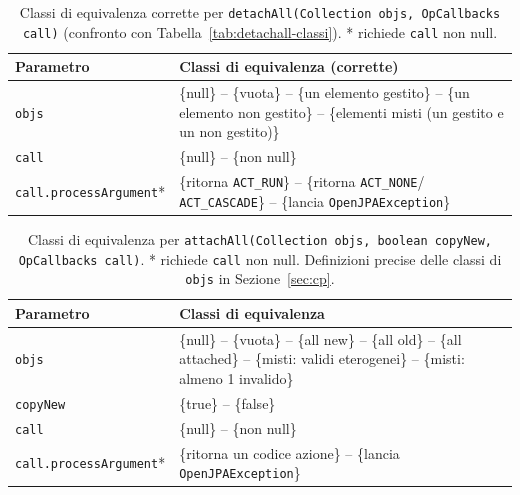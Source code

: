 \begin{table}[H]
\centering
\begin{tabularx}{\textwidth}{>{\raggedright\arraybackslash}p{} >{\raggedright\arraybackslash}X}
\toprule
Parametro & Classi di equivalenza (corrette) \\
\midrule
\texttt{objs} & \{null\} -- \{vuota\} -- \{un elemento gestito\} -- \{un elemento non gestito\}
-- \{elementi misti (un gestito e un non gestito)\} \\
\midrule
\texttt{call} & \{null\} -- \{non null\} \\
\texttt{call.processArgument}* & \{ritorna \texttt{ACT\_RUN}\} -- \{ritorna \texttt{ACT\_NONE}/
\texttt{ACT\_CASCADE}\} -- \{lancia \texttt{OpenJPAException}\} \\
\bottomrule
\end{tabularx}
\caption{Classi di equivalenza corrette per \texttt{detachAll(Collection objs, OpCallbacks
call)} (confronto con Tabella~\ref{tab:detachall-classi}). * richiede \texttt{call} non null.}
\label{tab:detachall-classi-corrette}
\end{table}

\begin{table}[H]
\centering
\begin{tabularx}{\textwidth}{>{\raggedright\arraybackslash}p{} >{\raggedright\arraybackslash}X}
\toprule
Parametro & Classi di equivalenza \\
\midrule
\texttt{objs} & \{null\} -- \{vuota\} -- \{all new\} -- \{all old\} -- \{all attached\} --
\{misti: validi eterogenei\} -- \{misti: almeno 1 invalido\} \\
\texttt{copyNew} & \{true\} -- \{false\} \\
\midrule
\texttt{call} & \{null\} -- \{non null\} \\
\texttt{call.processArgument}* & \{ritorna un codice azione\} -- \{lancia \texttt{OpenJPAException}\} \\
\bottomrule
\end{tabularx}
\caption{Classi di equivalenza per \texttt{attachAll(Collection objs, boolean copyNew,
OpCallbacks call)}. * richiede \texttt{call} non null. Definizioni precise delle classi di
\texttt{objs} in Sezione~\ref{sec:cp}.}
\label{tab:attachall-classi}
\end{table}

